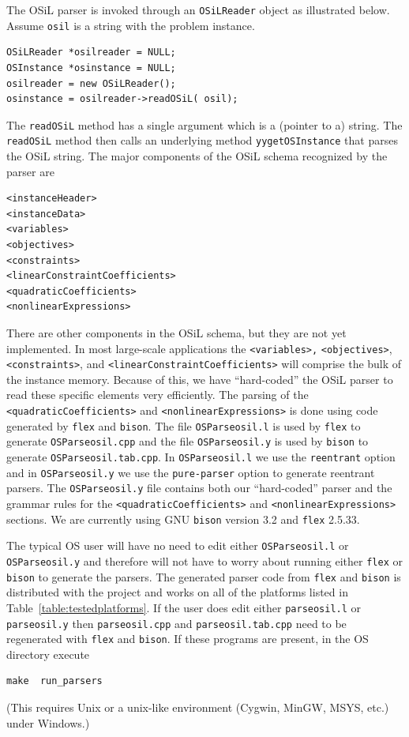 \documentclass[11pt]{article}
\renewcommand{\_}{{\char"5F}}
\renewcommand{\{}{{\char"7B}}
\renewcommand{\}}{{\char"7D}}
\renewcommand{\^}{{\char"0D}}
\renewcommand{\'}{{\char"0D}}
\begin{document}
\begin{enumerate}[Step 1:]
The OSiL parser is invoked through an {\tt OSiLReader} object as illustrated below. Assume {\tt osil} is a string with the problem instance.
\begin{verbatim}
OSiLReader *osilreader = NULL;
OSInstance *osinstance = NULL;
osilreader = new OSiLReader();
osinstance = osilreader->readOSiL( osil);
\end{verbatim}
The {\tt  readOSiL} method  has a single argument which is a (pointer to a) string. 
The {\tt  readOSiL} method then calls an underlying method {\tt yygetOSInstance} that parses the OSiL string. 
The major components of the OSiL schema  recognized by the parser are
\begin{verbatim}
<instanceHeader>
<instanceData>
<variables>
<objectives>
<constraints>
<linearConstraintCoefficients>
<quadraticCoefficients>
<nonlinearExpressions>
\end{verbatim}
There are other components in the OSiL schema, but they are not yet implemented.
In most large-scale applications the {\tt <variables>,} {\tt <objectives>}, {\tt <constraints>}, and {\tt <linearConstraintCoefficients>}
will comprise the bulk of the instance memory.  Because of this, we have ``hard-coded'' the OSiL parser
to read these specific elements very efficiently.
The parsing of the {\tt <quadraticCoefficients>} and {\tt <nonlinearExpressions>} is done using code generated
by {\tt flex} and {\tt bison}. The file  
{\tt OSParseosil.l} is used by {\tt flex} to generate {\tt OSParseosil.cpp} and the file 
{\tt OSParseosil.y} is used by {\tt bison} to generate {\tt OSParseosil.tab.cpp}.
In {\tt OSParseosil.l} we use the {\tt reentrant} option and in {\tt OSParseosil.y} we use the
{\tt pure-parser} option to generate reentrant parsers. The {\tt OSParseosil.y} file  contains both our
``hard-coded'' parser and the grammar rules for the  {\tt <quadraticCoefficients>} and
{\tt <nonlinearExpressions>} sections.
We are currently using GNU {\tt bison} version 3.2 and {\tt flex} 2.5.33.

The typical OS user will have no need to edit either {\tt OSParseosil.l} or {\tt OSParseosil.y} 
and therefore will not have to worry about running either {\tt flex} or {\tt bison} to generate the parsers. 
The generated parser code from {\tt flex} and {\tt bison} is distributed with the project and works on all 
of the platforms listed in Table~\ref{table:testedplatforms}.  If the user does edit either {\tt parseosil.l} 
or {\tt parseosil.y} then {\tt parseosil.cpp} and {\tt parseosil.tab.cpp} need to be regenerated with 
{\tt flex} and {\tt bison}. If these programs are present, in the OS directory  execute
\begin{verbatim}
make  run_parsers
\end{verbatim}
%
(This requires Unix or a unix-like environment (Cygwin, MinGW, MSYS, etc.) under Windows.)


\end{enumerate}
\end{document}
